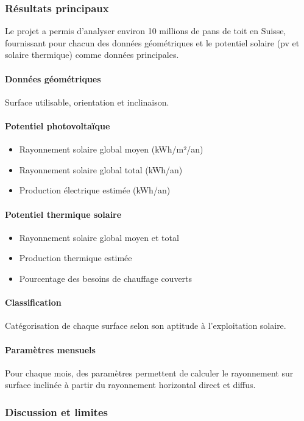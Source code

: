 \subsubsection{Résultats principaux}
\par{Le projet a permis d'analyser environ 10 millions de pans de toit en Suisse, fournissant pour chacun des données géométriques et le potentiel solaire (\acrshort{pv} et solaire thermique) comme données principales.}
\paragraph{Données géométriques} Surface utilisable, orientation et inclinaison.
\paragraph{Potentiel photovoltaïque}
\begin{itemize}
    \item Rayonnement solaire global moyen (kWh/m²/an)
    \item Rayonnement solaire global total (kWh/an)
    \item Production électrique estimée (kWh/an)
\end{itemize}
\paragraph{Potentiel thermique solaire}
\begin{itemize}
    \item Rayonnement solaire global moyen et total
    \item Production thermique estimée
    \item Pourcentage des besoins de chauffage couverts
\end{itemize}
\paragraph{Classification}
\par{Catégorisation de chaque surface selon son aptitude à l'exploitation solaire.}
\paragraph{Paramètres mensuels}
\par{Pour chaque mois, des paramètres permettent de calculer le rayonnement sur surface inclinée à partir du rayonnement horizontal direct et diffus.}
\subsubsection{Discussion et limites}

